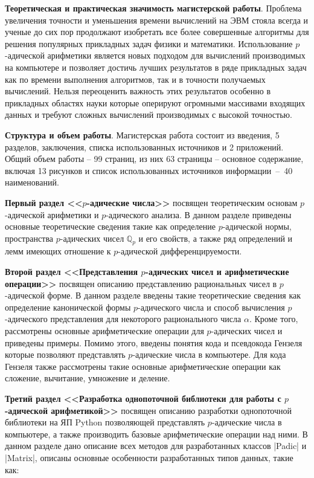 \documentclass[master, och, autoref, times]{sty/SCWorks}
\theoremstyle{plain}
\theoremstyle{definition}
\numberwithin{equation}{section}
\newcommand\summary[1][]{\starsection{КРАТКОЕ СОДЕРЖАНИЕ РАБОТЫ}}
\begin{document}
\textbf{Теоретическая и практическая значимость магистерской работы}. Проблема увеличения точности и уменьшения времени вычислений на ЭВМ стояла всегда и ученые до сих пор продолжают изобретать все более совершенные алгоритмы для решения популярных прикладных задач физики и математики. Использование $p$-адической арифметики является новых подходом для вычислений производимых на компьютере и позволяет достичь лучших результатов в ряде прикладных задач как по времени выполнения алгоритмов, так и в точности получаемых вычислений. Нельзя переоценить важность этих результатов особенно в прикладных областях науки которые оперируют огромными массивами входящих данных и требуют сложных вычислений производимых с высокой точностью.


\textbf{Структура и объем работы}.
Магистерская работа состоит из введения, 5 разделов, заключения, списка использованных источников и 2 приложений. Общий объем работы -- 99 страниц, из них 63 страницы -- основное содержание, включая 13 рисунков и список использованных источников \mbox{информации -- 40} наименований.


\summary 
\textbf{Первый раздел <<$p$-адические числа>>} посвящен теоретическим основам $p$-адической арифметики и $p$-адического анализа. В данном разделе приведены основные теоретические сведения такие как определение \mbox{$p$-адической} нормы, пространства $p$-адических чисел $\mathbb{Q}_p$ и его свойств, а \mbox{также} ряд определений и лемм имеющих отношение к $p$-адической \mbox{дифференцируемости}.


\textbf{Второй раздел <<Представления $p$-адических чисел и арифметические операции>>} посвящен описанию представлению рациональных чисел в $p$-адической форме. В данном разделе введены такие теоретические сведения как определение канонической формы $p$-адического числа и способ вычисления $p$-адического представления для некоторого рационального числа $\alpha$. Кроме того, рассмотрены основные арифметические операции для $p$-адических чисел и приведены примеры. Помимо этого, введены понятия кода и псевдокода Гензеля которые позволяют представлять $p$-адические числа в компьютере. Для кода Гензеля также рассмотрены такие основные арифметические операции как сложение, вычитание, умножение и деление.

\textbf{Третий раздел <<Разработка однопоточной библиотеки для работы с $p$-адической арифметикой>>} посвящен описанию разработки однопоточной библиотеки на ЯП Python позволяющей представлять $p$-адические числа в компьютере, а также производить базовые арифметические операции над ними. В данном разделе дано описание всех методов для разработанных классов |Padic| и |Matrix|, описаны основные особенности разработанных типов данных, такие как:
\end{document}
